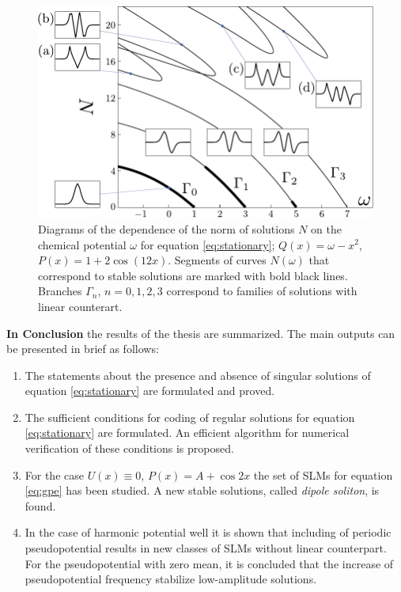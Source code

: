 \documentclass[candidate, href, colorlinks]{disser}
\begin{document}
\begin{figure}[h]
\centering
	\includegraphics[scale = 1]{pic/branches}
	\caption{
		Diagrams of the dependence of the norm of solutions $N$ on the chemical potential $\omega$ for equation \eqref{eq:stationary}; $Q(x) = \omega - x^2$, $P(x) = 1 + 2 \cos (12 x)$.
		Segments of curves $N(\omega)$ that correspond to stable solutions are marked with bold black lines.
		Branches $\Gamma_n$, $n = 0, 1, 2, 3$ correspond to families of solutions with linear counterart.
	}
\label{fig:branches}
\end{figure}


\textbf{In Conclusion} the results of the thesis are summarized.
The main outputs can be presented in brief as follows: 
\begin{enumerate}
	\item The statements about the presence and absence of singular solutions of equation \eqref{eq:stationary} are formulated and proved.
	\item The sufficient conditions for coding of regular solutions for equation \eqref{eq:stationary} are formulated.
	An efficient algorithm for numerical verification of these conditions is proposed.
	\item For the case $U(x) \equiv 0$, $P(x) = A + \cos 2x$ the set of SLMs for equation \eqref{eq:gpe} has been studied.
	A new stable solutions, called {\it dipole soliton}, is found.
	\item In the case of harmonic potential well it is shown that including of periodic pseudopotential results in new classes of SLMs without linear counterpart.
		For the pseudopotential with zero mean, it is concluded that the increase of pseudopotential frequency stabilize low-amplitude solutions.
\end{enumerate}
\end{document}
